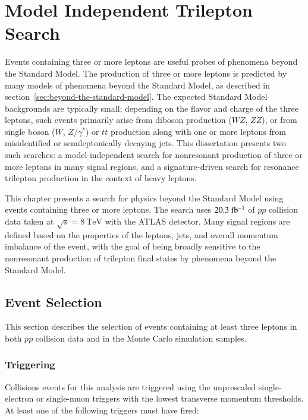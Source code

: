\chapter{Model Independent Trilepton Search}\label{ch:model-independent-trilepton-search}

Events containing three or more leptons are useful probes of phenomena beyond the Standard Model. The production of three or more leptons is predicted by many models of phenomena beyond the Standard Model, as described in section~\ref{sec:beyond-the-standard-model}. The expected Standard Model backgrounds are typically small; depending on the flavor and charge of the three leptons, such events primarily arise from diboson production ($WZ$, $ZZ$), or from single boson ($W$, $Z/\gamma^{*}$) or $t\bar{t}$ production along with one or more leptons from misidentified or semileptonically decaying jets.  This dissertation presents two such searches: a model-independent search for nonresonant production of three or more leptons in many signal regions, and a signature-driven search for resonance trilepton production in the context of heavy leptons. 

This chapter presents a search for physics beyond the Standard Model using events containing three or more leptons. The search uses $20.3~\mbox{fb$^{-1}$}$ of $pp$ collision data taken at $\sqrt{s}=8~\mbox{TeV}$ with the ATLAS detector. Many signal regions are defined based on the properties of the leptons, jets, and overall momentum imbalance of the event, with the goal of being broadly sensitive to the nonresonant production of trilepton final states by phenomena beyond the Standard Model. 

\section{Event Selection}\label{sec:model-independent-event-selection}

This section describes the selection of events containing at least three leptons in both $pp$ collision data and in the Monte Carlo simulation samples. 

\subsection{Triggering}
Collisions events for this analysis are triggered using the unprescaled single-electron or single-muon triggers with the lowest transverse momentum thresholds. At least one of the following triggers must have fired:

